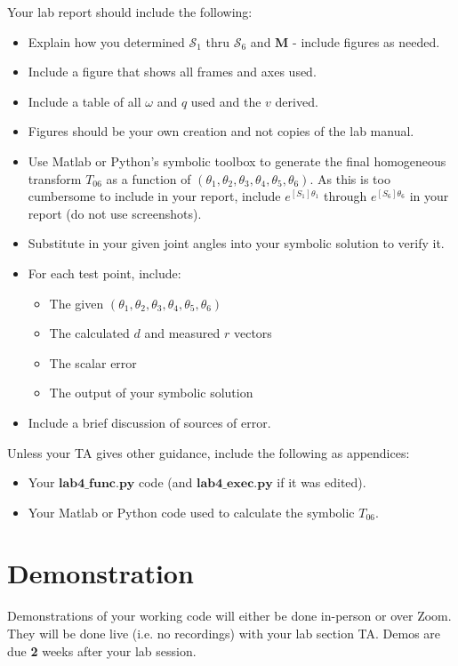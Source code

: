 Your lab report should include the following:
\begin{itemize}
\item Explain how you determined $\mathcal{S}_{1}$ thru $\mathcal{S}_{6}$ and $\textbf{M}$ - include figures as needed.
\item Include a figure that shows all frames and axes used.
\item Include a table of all $\omega$ and $q$ used and the $v$ derived.
\item Figures should be your own creation and not copies of the lab manual.

 \item Use Matlab or Python's symbolic toolbox to generate the final homogeneous transform $T_{06}$ as a function of $\left(\theta_{1},\theta_{2},\theta_{3},\theta_{4},\theta_{5},\theta_{6}\right)$.  As this is too cumbersome to include in your report, include $e^{[S_1]\theta_1}$ through $e^{[S_6]\theta_6}$ in your report (do not use screenshots).

\item Substitute in your given joint angles into your symbolic solution to verify it.
\item For each test point, include:
    \begin{itemize}
        \item The given $\left(\theta_{1},\theta_{2},\theta_{3},\theta_{4},\theta_{5},\theta_{6}\right)$
        \item The calculated $d$ and measured $r$ vectors
        \item The scalar error
        \item The output of your symbolic solution
    \end{itemize}
    \item Include a brief discussion of sources of error.
\end{itemize}
Unless your TA gives other guidance, include the following as appendices:
\begin{itemize}
    \item Your $\textbf{lab4\_func.py}$ code (and $\textbf{lab4\_exec.py}$ if it was edited).
    \item Your Matlab or Python code used to calculate the symbolic $T_{06}$.
\end{itemize}


\section{Demonstration}
Demonstrations of your working code will either be done in-person or over Zoom.  They will be done live (i.e. no recordings) with your lab section TA.  Demos are due \textbf{2} weeks after your lab session.\\

